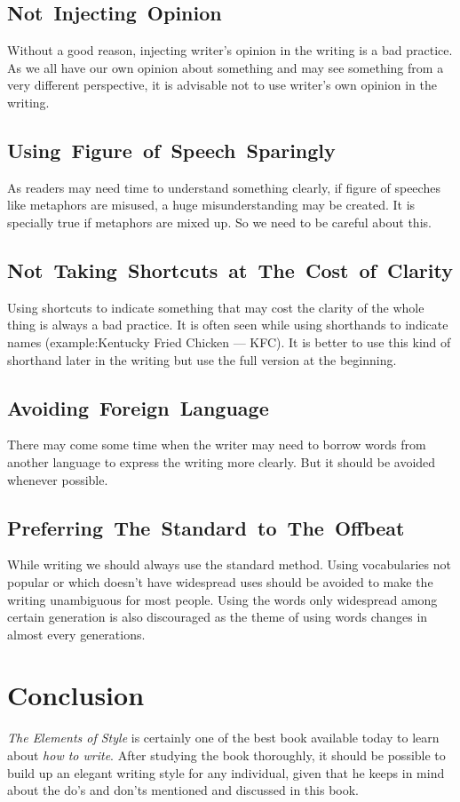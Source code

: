 \documentclass[12pt]{report}
\begin{document}
\section{\mbox{Not Injecting Opinion}}
Without a good reason, injecting writer's opinion in the writing is a bad practice. As we all have our own opinion about something and may see something from a very different perspective, it is advisable not to use writer's own opinion in the writing.


\section{\mbox{Using Figure of Speech Sparingly}}
As readers may need time to understand something clearly, if figure of speeches like metaphors are misused, a huge misunderstanding may be created. It is specially true if metaphors are mixed up. So we need to be careful about this.


\section{\mbox{Not Taking Shortcuts at The Cost of Clarity}}
Using shortcuts to indicate something that may cost the clarity of the whole thing is always a bad practice. It is often seen while using shorthands to indicate names (example:Kentucky Fried Chicken --- KFC). It is better to use this kind of shorthand later in the writing but use the full version at the beginning.


\section{\mbox{Avoiding Foreign Language}}
There may come some time when the writer may need to borrow words from another language to express the writing more clearly. But it should be avoided whenever possible. 


\section{\mbox{Preferring The Standard to The Offbeat}}
While writing we should always use the standard method. Using vocabularies not popular or which doesn't have widespread uses should be avoided to make the writing unambiguous for most people. Using the words only widespread among certain generation is also discouraged as the theme of using words changes in almost every generations.



\chapter{{Conclusion}}
\textit{The Elements of Style} is certainly one of the best book available today to learn about \textit{how to write}. After studying the book thoroughly, it should be possible to build up an elegant writing style for any individual, given that he keeps in mind about the do's and don'ts mentioned and discussed in this book.
\end{document}
